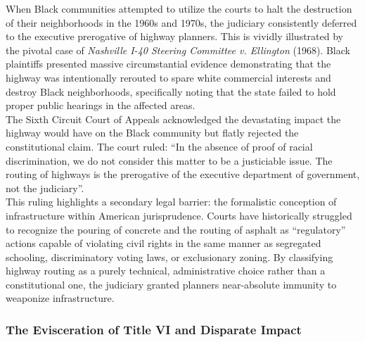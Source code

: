 \documentclass[
]{article}
\begin{document}
When Black communities attempted to utilize the courts to halt the
destruction of their neighborhoods in the 1960s and 1970s, the judiciary
consistently deferred to the executive prerogative of highway planners.
This is vividly illustrated by the pivotal case of \emph{Nashville I-40
Steering Committee v. Ellington} (1968). Black plaintiffs presented
massive circumstantial evidence demonstrating that the highway was
intentionally rerouted to spare white commercial interests and destroy
Black neighborhoods, specifically noting that the state failed to hold
proper public hearings in the affected areas.\\
The Sixth Circuit Court of Appeals acknowledged the devastating impact
the highway would have on the Black community but flatly rejected the
constitutional claim. The court ruled: ``In the absence of proof of
racial discrimination, we do not consider this matter to be a
justiciable issue. The routing of highways is the prerogative of the
executive department of government, not the judiciary''.\\
This ruling highlights a secondary legal barrier: the formalistic
conception of infrastructure within American jurisprudence. Courts have
historically struggled to recognize the pouring of concrete and the
routing of asphalt as ``regulatory'' actions capable of violating civil
rights in the same manner as segregated schooling, discriminatory voting
laws, or exclusionary zoning. By classifying highway routing as a purely
technical, administrative choice rather than a constitutional one, the
judiciary granted planners near-absolute immunity to weaponize
infrastructure.

\subsubsection{\texorpdfstring{\textbf{The Evisceration of Title VI and
Disparate
Impact}}{The Evisceration of Title VI and Disparate Impact}}\label{the-evisceration-of-title-vi-and-disparate-impact}
\end{document}
